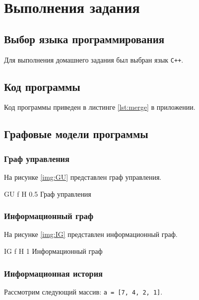 \chapter{Выполнения задания}

\section{Выбор языка программирования}
Для выполнения домашнего задания был выбран язык \texttt{C++}.

\section{Код программы}

Код программы приведен в листинге \ref{lst:merge} в приложении.




\section{Графовые модели программы}

\subsection{Граф управления}

На рисунке \ref{img:GU} представлен граф управления.

{GU} %
{f} %
{H} %
{0.5\textwidth} %
{Граф управления} %



\subsection{Информационный граф}

На рисунке \ref{img:IG} представлен информационный граф.

{IG} %
{f} %
{H} %
{1\textwidth} %
{Информационный граф} %

\subsection{Информационная история}
Рассмотрим следующий массив: \texttt{a = [7, 4, 2, 1]}.

